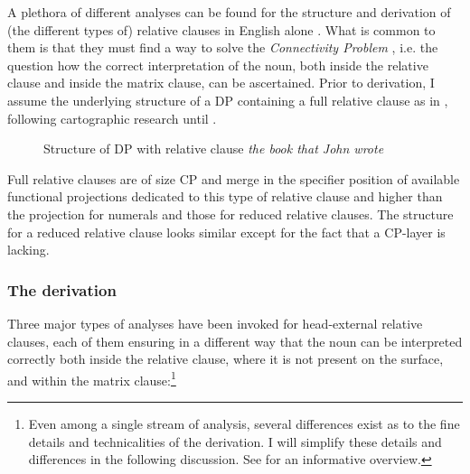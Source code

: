 A plethora of different analyses can be found for the structure and derivation of (the different types of) relative clauses in English alone \citep{schachter:1973:focus, vergnaud:1974:french, vergnaud:1985:dep, kayne:1994:anti, bianchi:1999:consequences, bhatt:2002:raising, salzmann:2019:new}. What is common to them is that they must find a way to solve the \textit{Connectivity Problem} \citep{salzmann:2017:reconstruction}, i.e. the question how the correct interpretation of the noun, both inside the relative clause and inside the matrix clause, can be ascertained. Prior to derivation, I assume the underlying structure of a DP containing a full relative clause as in , following cartographic research until \citet{cinque:2010:adj}. 

\begin{figure}
\centering
{}
\caption{Structure of DP with relative clause \textit{the book that John wrote}}
\label{Structure of full relative clause}
\end{figure}

Full relative clauses are of size CP and merge in the specifier position of available functional projections dedicated to this type of relative clause and higher than the projection for numerals and those for reduced relative clauses. The structure for a reduced relative clause looks similar except for the fact that a CP-layer is lacking.

\subsubsection{The derivation}

Three major types of analyses have been invoked for head-external relative clauses, each of them ensuring in a different way that the noun can be interpreted correctly both inside the relative clause, where it is not present on the surface, and within the matrix clause:\footnote{Even among a single stream of analysis, several differences exist as to the fine details and technicalities of the derivation. I will simplify these details and differences in the following discussion. See \citet[§ 2]{salzmann:2017:reconstruction} for an informative overview.}

